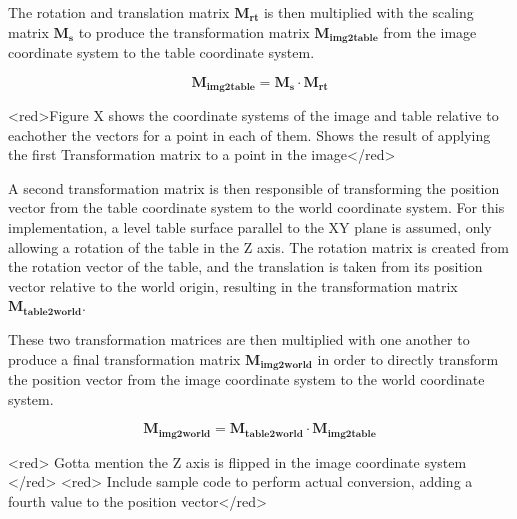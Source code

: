 The rotation and translation matrix $\mathbf{M_{rt}}$ is then multiplied with the scaling matrix $\mathbf{M_s}$ to produce the transformation matrix $\mathbf{M_{img2table}}$ from the image coordinate system to the table coordinate system.

$$\mathbf{M_{img2table}} = \mathbf{M_s} \cdot \mathbf{M_{rt}}$$

<red>Figure X shows the coordinate systems of the image and table relative to eachother the vectors for a point in each of them. Shows the result of applying the first Transformation matrix to a point in the image</red>


A second transformation matrix is then responsible of transforming the position vector from the table coordinate system to the world coordinate system. For this implementation, a level table surface parallel to the XY plane is assumed, only allowing a rotation of the table in the Z axis. The rotation matrix is created from the rotation vector of the table, and the translation is taken from its position vector relative to the world origin, resulting in the transformation matrix $\mathbf{M_{table2world}}$.

These two transformation matrices are then multiplied with one another to produce a final transformation matrix $\mathbf{M_{img2world}}$ in order to directly transform the position vector from the image coordinate system to the world coordinate system.

$$\mathbf{M_{img2world}} = \mathbf{M_{table2world}} \cdot \mathbf{M_{img2table}}$$



<red> Gotta mention the Z axis is flipped in the image coordinate system </red>
<red> Include sample code to perform actual conversion, adding a fourth value to the position vector</red>






